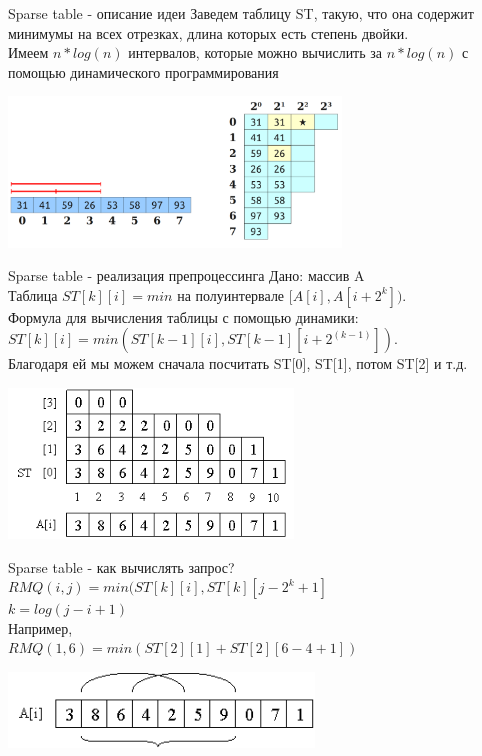 \documentclass[10pt]{beamer}
\begin{document}
\begin{frame}[fragile]{Sparse table - описание идеи}
Заведем таблицу ST, такую, что она содержит минимумы на всех отрезках, длина которых есть степень двойки.\\
Имеем $n*log(n)$ интервалов, которые можно вычислить за $n*log(n)$ с помощью динамического программирования
\begin{center}
    \includegraphics[height=4cm]{Term_2/Source/images/9-sparse-4.png}
\end{center}
\end{frame}

\begin{frame}[fragile]{Sparse table - реализация препроцессинга}
Дано: массив A \\
Таблица $ST[k][i] = min$ на полуинтервале $[ A[i], A[i+2^k] )$. \\
Формула для вычисления таблицы с помощью динамики:\\
$ST[k][i] = min( ST[k-1][i], ST[k-1][i + 2^(k-1)] )$. \\
Благодаря ей мы можем сначала посчитать ST[0], ST[1], потом ST[2] и т.д.
\begin{center}
    \includegraphics[height=4cm]{Term_2/Source/images/9-sparse-2.png}
\end{center}
\end{frame}

\begin{frame}[fragile]{Sparse table - как вычислять запрос?}
$RMQ(i,j) = min (ST[k][i], ST[k][ j - 2^k + 1]$ \\
$k = log( j-i+1)$ \\
Например, \\
$RMQ(1,6) = min ( ST[2][1] + ST[2][6-4+1])$
\begin{center}
    \includegraphics[height=2cm]{Term_2/Source/images/9-sparse-1.png}
\end{center}
\end{frame}
\end{document}
